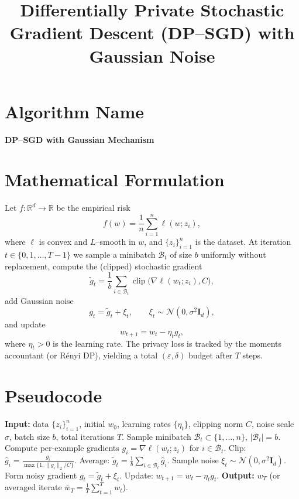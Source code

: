 \documentclass{article}
\newcommand{\R}{\mathbb{R}}
\begin{document}
\title{Differentially Private Stochastic Gradient Descent (DP--SGD) with Gaussian Noise}
\author{}
\date{}
\maketitle

\section*{Algorithm Name}
\textbf{DP--SGD with Gaussian Mechanism}

\section*{Mathematical Formulation}
Let $f:\R^d\rightarrow\R$ be the empirical risk
\[
f(w)=\frac{1}{n}\sum_{i=1}^{n} \ell(w;z_i),
\]
where $\ell$ is convex and $L$--smooth in $w$, and $\{z_i\}_{i=1}^n$ is the dataset.
At iteration $t\in\{0,1,\dots,T-1\}$ we sample a minibatch $\mathcal{B}_t$ of size $b$ uniformly without replacement,
compute the (clipped) stochastic gradient
\[
\tilde{g}_t=\frac{1}{b}\sum_{i\in\mathcal{B}_t}\operatorname{clip}\big(\nabla\ell(w_t;z_i),C\big),
\]
add Gaussian noise
\[
g_t=\tilde{g}_t + \xi_t,\qquad \xi_t\sim\mathcal{N}(0,\sigma^2\mathbf{I}_d),
\]
and update
\[
w_{t+1}= w_t - \eta_t g_t,
\]
where $\eta_t>0$ is the learning rate.  
The privacy loss is tracked by the moments accountant (or Rényi DP), yielding a total $(\varepsilon,\delta)$ budget after $T$ steps.

\section*{Pseudocode}
\begin{algorithm}[H]
\caption{DP--SGD with Gaussian Noise}
\begin{algorithmic}[1]
\STATE \textbf{Input:} data $\{z_i\}_{i=1}^n$, initial $w_0$, learning rates $\{\eta_t\}$, clipping norm $C$, noise scale $\sigma$, batch size $b$, total iterations $T$.
    \STATE Sample minibatch $\mathcal{B}_t\subset\{1,\dots,n\}$, $|\mathcal{B}_t|=b$.
    \STATE Compute per‑example gradients $g_i=\nabla\ell(w_t;z_i)$ for $i\in\mathcal{B}_t$.
    \STATE Clip: $\hat{g}_i=\frac{g_i}{\max\{1,\|g_i\|_2/C\}}$.
    \STATE Average: $\tilde{g}_t=\frac{1}{b}\sum_{i\in\mathcal{B}_t}\hat{g}_i$.
    \STATE Sample noise $\xi_t\sim\mathcal{N}(0,\sigma^2\mathbf{I}_d)$.
    \STATE Form noisy gradient $g_t=\tilde{g}_t+\xi_t$.
    \STATE Update: $w_{t+1}=w_t-\eta_t g_t$.
\ENDFOR
\STATE \textbf{Output:} $w_T$ (or averaged iterate $\bar w_T=\frac{1}{T}\sum_{t=1}^{T}w_t$).
\end{algorithmic}
\end{algorithm}
\end{document}
